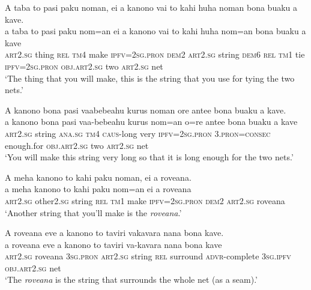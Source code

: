\ea\label{ex:text22-52}
A taba to pasi paku noman, ei a kanono vai to kahi huha noman bona buaku a kave.\\
\gll a	taba	to	pasi	paku	nom=an	ei	a	kanono	vai	to	kahi	huha	nom=an	bona	buaku	a	kave\\
     \textsc{art}2.\textsc{sg}	thing	\textsc{rel}	\textsc{tm}4	make	\textsc{ipfv}=2\textsc{sg}.\textsc{pron}	\textsc{dem}2	\textsc{art}2.\textsc{sg}	string	\textsc{dem}6	\textsc{rel}	\textsc{tm}1	tie	\textsc{ipfv}=2\textsc{sg}.\textsc{pron}	\textsc{obj}.\textsc{art}2.\textsc{sg}	two	\textsc{art}2.\textsc{sg}	net\\
\glt `The thing that you will make, this is the string that you use for tying the two nets.'
\z

\ea\label{ex:text22-53}
A kanono bona pasi vaabebeahu kurus noman ore antee bona buaku a kave.\\
\gll a	kanono	bona	pasi	vaa-bebeahu	kurus	nom=an	o=re	antee	bona	buaku	a	kave\\
     \textsc{art}2.\textsc{sg}	string	\textsc{ana}.\textsc{sg}	\textsc{tm}4	\textsc{caus}-long	very	\textsc{ipfv}=2\textsc{sg}.\textsc{pron}	3.\textsc{pron}=\textsc{consec}	enough.for	\textsc{obj}.\textsc{art}2.\textsc{sg}	two	\textsc{art}2.\textsc{sg}	net\\
\glt `You will make this string very long so that it is long enough for the two nets.'
\z

\ea\label{ex:text22-54}
A meha kanono to kahi paku noman, ei a roveana.\\
\gll a	meha	kanono	to	kahi	paku	nom=an	ei	a	roveana\\
     \textsc{art}2.\textsc{sg}	other2.\textsc{sg}	string	\textsc{rel}	\textsc{tm}1	make	\textsc{ipfv}=2\textsc{sg}.\textsc{pron}	\textsc{dem}2	\textsc{art}2.\textsc{sg}	roveana\\
\glt `Another string that you'll make is the \textit{roveana}.'
\z

\ea\label{ex:text22-55}
A roveana eve a kanono to taviri vakavara nana bona kave.\\
\gll a	roveana	eve	a	kanono	to	taviri	va-kavara	nana	bona	kave\\
     \textsc{art}2.\textsc{sg}	roveana	3\textsc{sg}.\textsc{pron}	\textsc{art}2.\textsc{sg}	string	\textsc{rel}	surround	\textsc{advr}-complete	3\textsc{sg}.\textsc{ipfv}	\textsc{obj}.\textsc{art}2.\textsc{sg}	net\\
\glt `The \textit{roveana} is the string that surrounds the whole net (as a seam).'
\z

